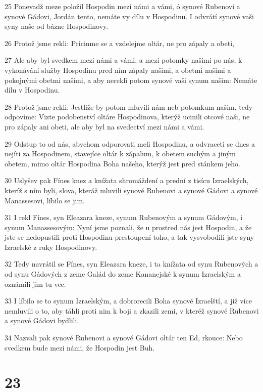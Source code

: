 \par 25 Ponevadž meze položil Hospodin mezi námi a vámi, ó synové Rubenovi a synové Gádovi, Jordán tento, nemáte vy dílu v Hospodinu. I odvrátí synové vaši syny naše od bázne Hospodinovy.
\par 26 Protož jsme rekli: Pricinme se a vzdelejme oltár, ne pro zápaly a obeti,
\par 27 Ale aby byl svedkem mezi námi a vámi, a mezi potomky našimi po nás, k vykonávání služby Hospodinu pred ním zápaly našimi, a obetmi našimi a pokojnými obetmi našimi, a aby nerekli potom synové vaši synum našim: Nemáte dílu v Hospodinu.
\par 28 Protož jsme rekli: Jestliže by potom mluvili nám neb potomkum našim, tedy odpovíme: Vizte podobenství oltáre Hospodinova, kterýž ucinili otcové naši, ne pro zápaly ani obeti, ale aby byl na svedectví mezi námi a vámi.
\par 29 Odstup to od nás, abychom odporovati meli Hospodinu, a odvraceti se dnes a nejíti za Hospodinem, stavejíce oltár k zápalum, k obetem suchým a jiným obetem, mimo oltár Hospodina Boha našeho, kterýž jest pred stánkem jeho.
\par 30 Uslyšev pak Fínes knez a knížata shromáždení a prední z tisícu Izraelských, kteríž s ním byli, slova, kteráž mluvili synové Rubenovi a synové Gádovi a synové Manassesovi, líbilo se jim.
\par 31 I rekl Fínes, syn Eleazara kneze, synum Rubenovým a synum Gádovým, i synum Manassesovým: Nyní jsme poznali, že u prostred nás jest Hospodin, a že jste se nedopustili proti Hospodinu prestoupení toho, a tak vysvobodili jste syny Izraelské z ruky Hospodinovy.
\par 32 Tedy navrátil se Fínes, syn Eleazara kneze, i ta knížata od synu Rubenových a od synu Gádových z zeme Galád do zeme Kananejské k synum Izraelským a oznámili jim tu vec.
\par 33 I líbilo se to synum Izraelským, a dobrorecili Boha synové Izraelští, a již více nemluvili o to, aby táhli proti nim k boji a zkazili zemi, v kteréž synové Rubenovi a synové Gádovi bydlili.
\par 34 Nazvali pak synové Rubenovi a synové Gádovi oltár ten Ed, rkouce: Nebo svedkem bude mezi námi, že Hospodin jest Buh.

\chapter{23}

